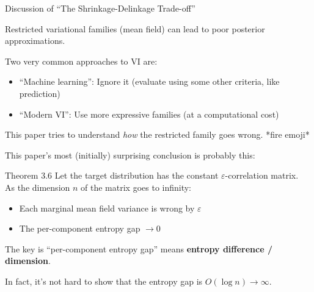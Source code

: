 \documentclass[8pt]{beamer}\usepackage[]{graphicx}\usepackage[]{color}
\begin{document}

\begin{frame}{Discussion of ``The Shrinkage-Delinkage Trade-off''}

Restricted variational families (mean field) can lead to poor posterior approximations.

Two very common approaches to VI are:
%
\begin{itemize}
\item ``Machine learning'': Ignore it (evaluate using some other criteria, like prediction)
\item ``Modern VI'': Use more expressive families (at a computational cost)
\end{itemize}
%
This paper tries to understand \emph{how} the restricted family goes wrong.  *fire emoji*

\pause
\hrulefill

This paper's most (initially) surprising conclusion is probably this:

\begin{block}{Theorem 3.6}
%
Let the target distribution has the constant $\varepsilon$-correlation matrix.\\
As the dimension $n$ of the matrix goes to infinity:
%
\begin{itemize}
\item Each marginal mean field variance is wrong by $\varepsilon$
\item The per-component entropy gap $\rightarrow 0$
\end{itemize}
%
\end{block}


\pause
The key is ``per-component entropy gap'' means \textbf{entropy difference / dimension}.


In fact, it's not hard to show that the entropy gap is $O(\log n) \rightarrow \infty$.
%
%


\end{frame}
\end{document}
